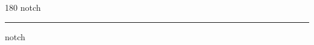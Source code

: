 
\begin{frame}
\begin{center}
\begin{turn}{180}
{\fontsize{2.5cm}{1em}\selectfont notch}
\end{turn}
\vspace{1em}\par  
\hrule
\vspace{1em}\par  
{\fontsize{2.5cm}{1em}\selectfont notch}
\end{center}
\end{frame}
